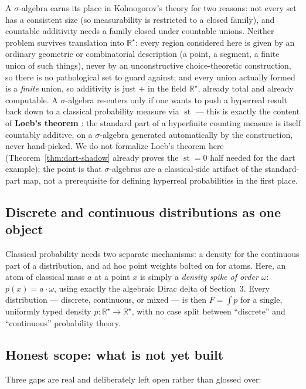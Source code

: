 \documentclass[11pt]{article}
\theoremstyle{definition}
\theoremstyle{remark}
\newcommand{\Rstar}{\mathbb{R}^{\star}}
\newcommand{\st}{\operatorname{st}}
\begin{document}
A $\sigma$-algebra earns its place in Kolmogorov's theory for two reasons:
not every set has a consistent size (so measurability is restricted to a
closed family), and countable additivity needs a family closed under
countable unions. Neither problem survives translation into $\Rstar$:
every region considered here is given by an ordinary geometric or
combinatorial description (a point, a segment, a finite union of such
things), never by an unconstructive choice-theoretic construction, so there
is no pathological set to guard against; and every union actually formed
is a \emph{finite} union, so additivity is just $+$ in the field $\Rstar$,
already total and already computable. A $\sigma$-algebra re-enters only if
one wants to push a hyperreal result back down to a classical probability
measure via $\st$ — this is exactly the content of \textbf{Loeb's theorem}
\cite{loeb}: the standard part of a hyperfinite counting measure is
itself countably additive, on a $\sigma$-algebra generated automatically by
the construction, never hand-picked. We do not formalize Loeb's theorem
here (Theorem~\ref{thm:dart-shadow} already proves the $\st=0$ half needed
for the dart example); the point is that $\sigma$-algebras are a
classical-side artifact of the standard-part map, not a prerequisite for
defining hyperreal probabilities in the first place.

\subsection{Discrete and continuous distributions as one object}

Classical probability needs two separate mechanisms: a density for the
continuous part of a distribution, and ad hoc point weights bolted on for
atoms. Here, an atom of classical mass $a$ at a point $x$ is simply a
\emph{density spike of order $\omega$}: $p(x) = a\cdot\omega$, using
exactly the algebraic Dirac delta of Section~3. Every distribution ---
discrete, continuous, or mixed --- is then $F = \int p$ for a single,
uniformly typed density $p : \Rstar \to \Rstar$, with no case split between
``discrete'' and ``continuous'' probability theory.

\subsection{Honest scope: what is not yet built}\label{sec:gaps}

Three gaps are real and deliberately left open rather than glossed over:
\end{document}
